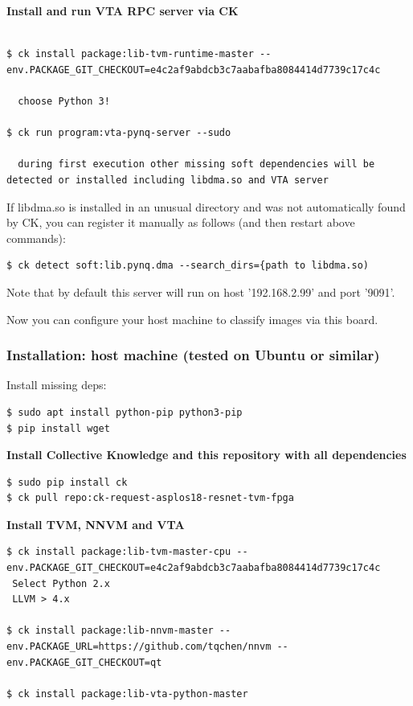 \documentclass[sigconf]{acmart}
\begin{document}
\textbf{Install and run VTA RPC server via CK}

\begin{verbatim}

$ ck install package:lib-tvm-runtime-master --env.PACKAGE_GIT_CHECKOUT=e4c2af9abdcb3c7aabafba8084414d7739c17c4c

  choose Python 3!

$ ck run program:vta-pynq-server --sudo

  during first execution other missing soft dependencies will be detected or installed including libdma.so and VTA server

\end{verbatim}

If libdma.so is installed in an unusual directory and was not automatically found by CK, 
you can register it manually as follows (and then restart above commands):

\begin{verbatim}
$ ck detect soft:lib.pynq.dma --search_dirs={path to libdma.so)
\end{verbatim}

Note that by default this server will run on host '192.168.2.99' and port '9091'.

Now you can configure your host machine to classify images via this board.

\subsubsection{Installation: host machine (tested on Ubuntu or similar)}

Install missing deps:

\begin{verbatim}
$ sudo apt install python-pip python3-pip
$ pip install wget
\end{verbatim}

\textbf{Install Collective Knowledge and this repository with all dependencies}

\begin{verbatim}
$ sudo pip install ck
$ ck pull repo:ck-request-asplos18-resnet-tvm-fpga
\end{verbatim}

\textbf{Install TVM, NNVM and VTA}

\begin{verbatim}
$ ck install package:lib-tvm-master-cpu --env.PACKAGE_GIT_CHECKOUT=e4c2af9abdcb3c7aabafba8084414d7739c17c4c
 Select Python 2.x
 LLVM > 4.x

$ ck install package:lib-nnvm-master --env.PACKAGE_URL=https://github.com/tqchen/nnvm --env.PACKAGE_GIT_CHECKOUT=qt

$ ck install package:lib-vta-python-master
\end{verbatim}
\end{document}
